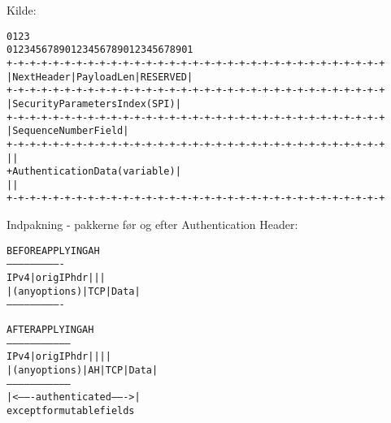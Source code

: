 \documentclass[Screen16to9,17pt]{foils}
\begin{document}

\centerline{Kilde: }



\begin{alltt}
\small
    0                   1                   2                   3
    0 1 2 3 4 5 6 7 8 9 0 1 2 3 4 5 6 7 8 9 0 1 2 3 4 5 6 7 8 9 0 1
   +-+-+-+-+-+-+-+-+-+-+-+-+-+-+-+-+-+-+-+-+-+-+-+-+-+-+-+-+-+-+-+-+
   | Next Header   |  Payload Len  |          RESERVED             |
   +-+-+-+-+-+-+-+-+-+-+-+-+-+-+-+-+-+-+-+-+-+-+-+-+-+-+-+-+-+-+-+-+
   |                 Security Parameters Index (SPI)               |
   +-+-+-+-+-+-+-+-+-+-+-+-+-+-+-+-+-+-+-+-+-+-+-+-+-+-+-+-+-+-+-+-+
   |                    Sequence Number Field                      |
   +-+-+-+-+-+-+-+-+-+-+-+-+-+-+-+-+-+-+-+-+-+-+-+-+-+-+-+-+-+-+-+-+
   |                                                               |
   +                Authentication Data (variable)                 |
   |                                                               |
   +-+-+-+-+-+-+-+-+-+-+-+-+-+-+-+-+-+-+-+-+-+-+-+-+-+-+-+-+-+-+-+-+
\end{alltt}


Indpakning - pakkerne før og efter Authentication Header:
\begin{alltt}
\small
                BEFORE APPLYING AH
            ----------------------------
      IPv4  |orig IP hdr  |     |      |
            |(any options)| TCP | Data |
            ----------------------------

                  AFTER APPLYING AH
            ---------------------------------
      IPv4  |orig IP hdr  |    |     |      |
            |(any options)| AH | TCP | Data |
            ---------------------------------
            |<------- authenticated ------->|
                 except for mutable fields
\end{alltt}

\end{document}
